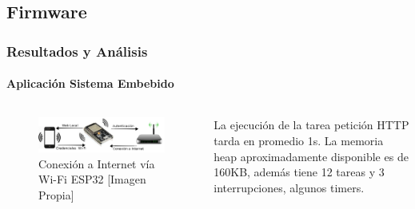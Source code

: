 \subsection{Firmware}
\begin{frame}
\frametitle{Resultados y Análisis}
\framesubtitle{Aplicación Sistema Embebido}
\begin{columns}
\begin{figure}
	\centering
	\caption{Conexión a Internet vía Wi-Fi ESP32 [Imagen Propia]}
	\label{fig:conexion}
	\includegraphics[width=\linewidth]{Imagenes/conexion}
\end{figure}
	
	La ejecución de la tarea petición HTTP tarda en promedio 1s. La memoria heap aproximadamente disponible es de 160KB, además tiene 12 tareas y 3 interrupciones, algunos timers.
	
\end{columns}
\end{frame}

